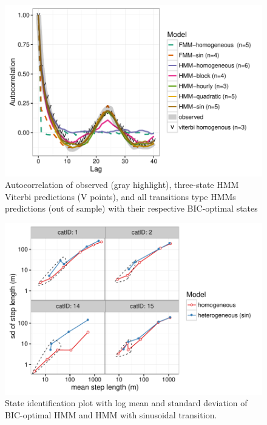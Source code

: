\documentclass{article}\usepackage[]{graphicx}\usepackage{xcolor}
\makeatletter
\def\maxwidth{ %
  \ifdim\Gin@nat@width>\linewidth
    \linewidth
  \else
    \Gin@nat@width
  \fi
}
\newenvironment{knitrout}{}{} %
\makeatother
\begin{document}
\clearpage

\begin{knitrout}
\color{fgcolor}\begin{figure}
\includegraphics[width=\maxwidth]{figure/acf_plot-1} \caption[Autocorrelation of observed (gray highlight), three-state HMM Viterbi predictions (V points), and all transitions type HMMs predictions (out of sample) with their respective BIC-optimal states ]{Autocorrelation of observed (gray highlight), three-state HMM Viterbi predictions (V points), and all transitions type HMMs predictions (out of sample) with their respective BIC-optimal states }\label{fig:acf_plot}
\end{figure}


\end{knitrout}

\clearpage

\begin{knitrout}
\color{fgcolor}\begin{figure}
\includegraphics[width=\maxwidth]{figure/r_msdlist-1} \caption[State identification plot with log mean and standard deviation of BIC-optimal HMM and HMM with sinusoidal transition]{State identification plot with log mean and standard deviation of BIC-optimal HMM and HMM with sinusoidal transition.}\label{fig:r msdlist}
\end{figure}


\end{knitrout}
\end{document}
